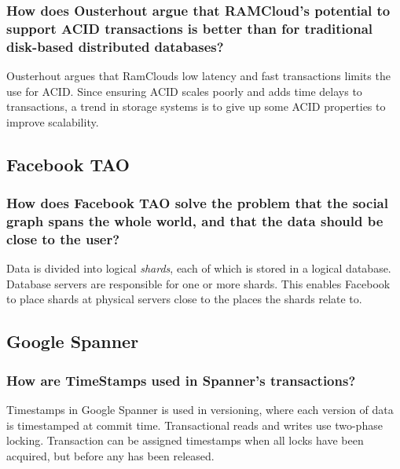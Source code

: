 \documentclass{article}
\begin{document}
\subsubsection*{How does Ousterhout argue that RAMCloud's potential to support ACID transactions is better than for traditional disk-based distributed databases?}
Ousterhout argues that RamClouds low latency and fast transactions limits the use for ACID. Since ensuring ACID scales poorly and adds time
delays to transactions, a trend in storage systems is to give up some ACID properties to improve scalability.
\subsection*{Facebook TAO}
\subsubsection*{How does Facebook TAO solve the problem that the social graph spans the whole world, and that the data should be close to the user?}
Data is divided into logical \textit{shards}, each of which is stored in a logical database. Database servers are responsible for one or more shards. This enables Facebook to place shards at physical servers close to the places the shards relate to.

\subsection*{Google Spanner}
\subsubsection*{How are TimeStamps used in Spanner's transactions?}
Timestamps in Google Spanner is used in versioning, where each version of data is timestamped at commit time. Transactional reads and writes
use two-phase locking. Transaction can be assigned timestamps when all locks have been acquired, but before any has been released.
\end{document}
